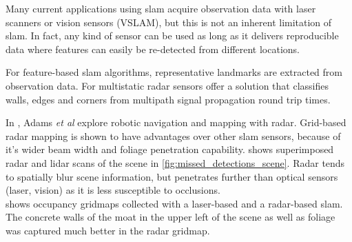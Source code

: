 Many current applications using slam acquire observation data with laser scanners or vision sensors (VSLAM), but this is not an inherent limitation of slam. In fact, any kind of sensor can be used as long as it delivers reproducible data where features can easily be re-detected from different locations.

For feature-based slam algorithms, representative landmarks are extracted from observation data. For multistatic radar sensors \cite{Deissler2013,Deissler2012,Seitz2008,Deissler2009} offer a solution that classifies walls, edges and corners from multipath signal propagation round trip times.

In \cite{Adams2012}, Adams \textit{et al} explore robotic navigation and mapping with radar. Grid-based radar mapping is shown to have advantages over other slam sensors, because of it's wider beam width and foliage penetration capability.  shows superimposed radar and lidar scans of the scene in \cref{fig:missed_detections_scene}. Radar tends to spatially blur scene information, but penetrates further than optical sensors (laser, vision) as it is less susceptible to occlusions.\\
 shows occupancy gridmaps collected with a laser-based and a radar-based slam. The concrete walls of the moat in the upper left of the scene as well as foliage was captured much better in the radar gridmap.

